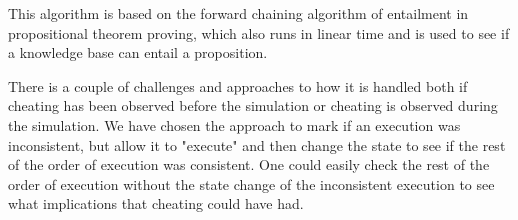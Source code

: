 	\newpar This algorithm is based on the forward chaining algorithm of entailment in propositional theorem proving, which also runs in linear time and is used to see if a knowledge base can entail a proposition. 
	
    \newpar There is a couple of challenges and approaches to how it is handled both if cheating has been observed before the simulation or cheating is observed during the simulation. We have chosen the approach to mark if an execution was inconsistent, but allow it to "execute" and then change the state to see if the rest of the order of execution was consistent. One could easily check the rest of the order of execution without the state change of the inconsistent execution to see what implications that cheating could have had.
